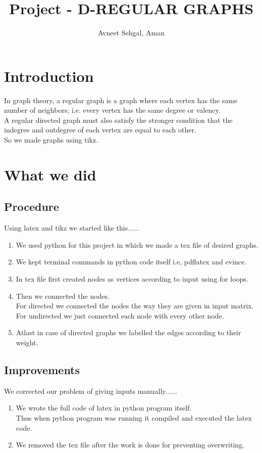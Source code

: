 \documentclass[a4paper,11pt]{article}
\title{Project - D-REGULAR GRAPHS}
\author{Avneet Sehgal, Aman}
\begin{document}
      \maketitle
         \section{Introduction}{In graph theory, a regular graph is a graph where each vertex has the same number of neighbors; i.e. every vertex has the same degree or valency. \\ A regular directed graph must also satisfy the stronger condition that the indegree and outdegree of each vertex are equal to each other. \\So we made graphs using tikz.}
         \section{What we did}
            \subsection{Procedure}{Using latex and tikz we started like this......
            \begin{enumerate}
       \item We used python for this project in which we made a tex file of desired graphs. 
       \item We kept terminal commands in python code itself i.e, pdflatex and evince.
       \item In tex file first created nodes as vertices according to input using for loops. 
       \item Then we connected the nodes. \\For directed we connected the nodes the way they are given in input matrix.\\For undirected we just connected each node with every other node.
       \item Atlast in case of directed graphs we labelled the edges according to their weight.
   \end{enumerate}}
          \subsection{Improvements}{We corrected our problem of giving inputs manually......
              \begin{enumerate}
       \item We wrote the full code of latex in python program itself.\\Thus when python program was running it compiled and executed the latex code.
       \item We removed the tex file after the work is done for preventing overwriting.
   \end{enumerate}}
\end{document}
